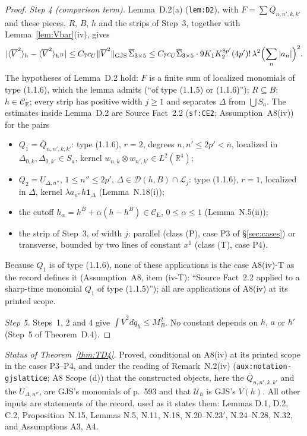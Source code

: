 \documentclass[11pt,a4paper]{article}
\newcommand{\R}{\mathbb{R}}
\newcommand{\CE}{\mathcal{C}_{\mathrm E}}
\newcommand{\GJS}[1]{\lVert #1\rVert_{\mathrm{GJS}}}
\newcommand{\ev}[2]{\langle #1\rangle_{#2}}
\newcommand{\Uc}{\mathcal U}
\newcommand{\Vb}{\overline V}                 %
\theoremstyle{plain}
\theoremstyle{definition}
\begin{document}
\begin{proof}
\emph{Step 4 (comparison term).}  Lemma~D.2(a) (\texttt{lem:D2}), with $F=\sum\overline
Q_{n,n',k,k'}$ and these pieces, $R$, $B$, $h$ and the strips of Step~3, together with
Lemma~\ref{lem:Vbar}(iv), gives
\[
 |\ev{\Vb^2}{h}-\ev{\Vb^2}{h^B}|\le C_7c_U\GJS{\Vb^2}\,\overline\Sigma_{3\times5}
 \le C_7c_U\overline\Sigma_{3\times5}\cdot9K_1K_2^{8p'}(4p')!\,\lambda^2\Bigl(\sum_n|a_n|\Bigr)^2 .
\]
The hypotheses of Lemma~D.2 hold: $F$ is a finite sum of localized monomials of type (1.1.6),
which the lemma admits (``of type (1.1.5) or (1.1.6)''); $R\subseteq B$; $h\in\CE$; every
strip has positive width $j\ge1$ and separates $\Delta$ from $\bigcup S_a$.  The estimates
inside Lemma~D.2 are Source Fact~2.2 (\texttt{sf:CE2}; Assumption~A8(iv)) for the pairs
\begin{itemize}
\item $Q_1=\overline Q_{n,n',k,k'}$: type (1.1.6), $r=2$, degrees $n,n'\le2p'<\bar n$,
localized in $\Delta_{0,k},\Delta_{0,k'}\in S_a$, kernel $w_{n,k}\otimes w_{n',k'}\in L^2(\R^4)$;
\item $Q_2=U_{\Delta,n''}$, $1\le n''\le2p'$, $\Delta\in\mathcal D(h,B)\cap\mathcal L_j$: type
(1.1.6), $r=1$, localized in $\Delta$, kernel $\lambda a_{n''}h\mathbf 1_\Delta$
(Lemma~N.18(i));
\item the cutoff $h_\alpha=h^B+\alpha(h-h^B)\in\CE$, $0\le\alpha\le1$ (Lemma~N.5(ii));
\item the strip of Step~3, of width $j$: parallel (class (P), case P3 of \S\ref{sec:cases}) or
transverse, bounded by two lines of constant $x^1$ (class (T), case P4).
\end{itemize}
Because $Q_1$ is of type (1.1.6), none of these applications is the case A8(iv)-T as the record
defines it (Assumption~A8, item (iv-T): ``Source Fact~2.2 applied to a sharp-time monomial
$Q_1$ of type (1.1.5)''); all are applications of A8(iv) at its printed scope.

\emph{Step 5.}  Steps~1, 2 and 4 give $\int\Vb^2dq_h\le M_B^2$.  No constant depends on $h$,
$a$ or $h'$ (Step~5 of Theorem~D.4).
\end{proof}

\emph{Status of Theorem~\ref{thm:TD4}.}  Proved, conditional on A8(iv) at its printed scope in
the cases P3--P4, and under the reading of Remark~N.2(iv) (\texttt{aux:notation-gjslattice};
A8 Scope (d)) that the constructed objects, here the $\overline Q_{n,n',k,k'}$ and the
$U_{\Delta,n''}$, are GJS's monomials of p.~593 and that $\Uc_h$ is GJS's $V(h)$.  All other
inputs are statements of the record, used as it states them: Lemmas D.1, D.2, C.2,
Proposition~N.15, Lemmas N.5, N.11, N.18, N.20--N.23$'$, N.24--N.28, N.32, and Assumptions A3,
A4.
\end{document}
